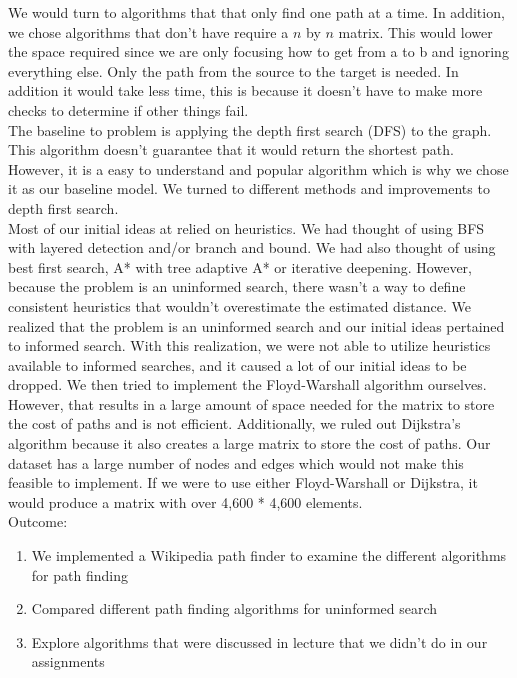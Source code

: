 \documentclass[letterpaper]{article} %
\begin{document}
We would turn to algorithms that that only find one path at a time. In addition, we chose algorithms that don't have require a $n$ by $n$ matrix. This would lower the space required since we are only focusing how to get from a to b and ignoring everything else. Only the path from the source to the target is needed. In addition it would take less time, this is because it doesn't have to make more checks to determine if other things fail.\\

The baseline to problem is applying the depth first search (DFS) to the graph. This algorithm doesn't guarantee that it would return the shortest path. However, it is a easy to understand and popular algorithm which is why we chose it as our baseline model. We turned to different methods and improvements to depth first search.\\

Most of our initial ideas at relied on heuristics. We had thought of using BFS with layered detection and/or branch and bound. We had also thought of using best first search, A* with tree adaptive A* or iterative deepening. However, because the problem is an uninformed search, there wasn't a way to define consistent heuristics that wouldn't overestimate the estimated distance. We realized that the problem is an uninformed search and our initial ideas pertained to informed search. With this realization, we were not able to utilize heuristics available to informed searches, and it caused a lot of our initial ideas to be dropped. We then tried to implement the Floyd-Warshall algorithm ourselves. However, that results in a large amount of space needed for the matrix to store the cost of paths and is not efficient. Additionally, we ruled out Dijkstra's algorithm because it also creates a large matrix to store the cost of paths. Our dataset has a large number of nodes and edges which would not make this feasible to implement. If we were to use either Floyd-Warshall or Dijkstra, it would produce a matrix with over 4,600 * 4,600 elements.\\

Outcome:

\begin{enumerate}
  
\item We implemented a Wikipedia path finder to examine the different algorithms for path finding
\item Compared different path finding algorithms for uninformed search
\item Explore algorithms that were discussed in lecture that we didn't do in our assignments
\end{enumerate}
\end{document}
